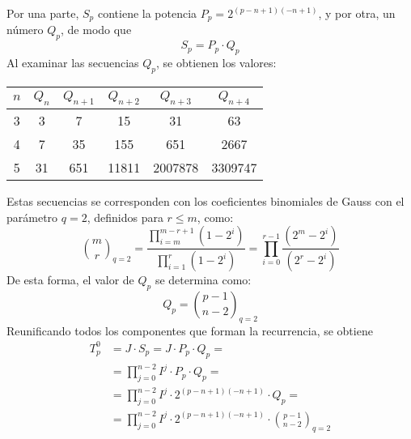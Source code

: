 %
Por una parte, $S_p$ contiene la potencia $P_p = 2^{(p-n+1)(-n+1)}$, y por otra, 
un número $Q_p$, de modo que
$$ S_p = P_p \cdot Q_p$$
%
Al examinar las secuencias $Q_p$, se obtienen los valores:
\begin{center}
	\begin{tabular}{|c|c *{4}{|c}|}
		\hline
		$n$ & $Q_{n}$ & $Q_{n+1}$ & $Q_{n+2}$ & $Q_{n+3}$ & $Q_{n+4}$ \\    & 3       & 7         & 15        & 31        & 63        \\
		4   & 7       & 35        & 155       & 651       & 2667      \\
		5   & 31      & 651       & 11811     & 2007878   & 3309747   \\
		\hline
	\end{tabular}
\end{center}
%
Estas secuencias se corresponden con los coeficientes binomiales de Gauss con el 
parámetro $q=2$, definidos para $r\leq m$, como:
$$
	{m \choose r}_{q=2} = \frac
		{\prod_{i=m}^{m-r+1}{(1-2^i)}}
		{\prod_{i=1}^{r}{(1-2^i)}} =
	\prod_{i = 0}^{r-1}{\frac
		{(2^m-2^i)}
		{(2^r-2^i)}}
$$
De esta forma, el valor de $Q_p$ se determina como:
$$
Q_p = {p-1 \choose n-2}_{q=2}
$$
%
Reunificando todos los componentes que forman la recurrencia, se obtiene
\begin{equation}
\label{eq_T}
\begin{split}
	T^0_p &= J \cdot S_p = J \cdot P_p \cdot Q_p = \\
	&= \prod^{n-2}_{j=0} I^j \cdot P_p \cdot Q_p = \\
	&= \prod^{n-2}_{j=0} I^j \cdot 2^{(p-n+1)(-n+1)} \cdot Q_p = \\
	&= \prod^{n-2}_{j=0} I^j \cdot 2^{(p-n+1)(-n+1)} \cdot {p-1 \choose n-2}_{q=2}
\end{split}
\end{equation}
%

